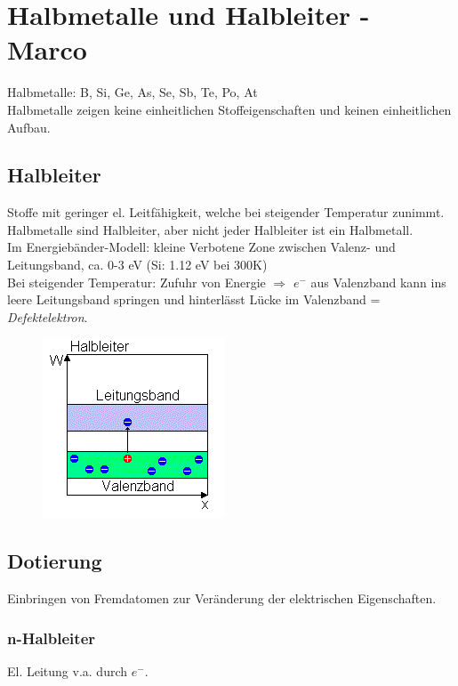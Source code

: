 \section{Halbmetalle und Halbleiter - Marco}
Halbmetalle: B, Si, Ge, As, Se, Sb, Te, Po, At \\

Halbmetalle zeigen keine einheitlichen Stoffeigenschaften und keinen einheitlichen Aufbau. \\

\subsection{Halbleiter}
Stoffe mit geringer el. Leitfähigkeit, welche bei steigender Temperatur zunimmt. Halbmetalle sind Halbleiter, aber nicht jeder Halbleiter ist ein Halbmetall. \\

Im Energiebänder-Modell: kleine Verbotene Zone zwischen Valenz- und Leitungsband, ca. 0-3 eV (Si: 1.12 eV bei 300K) \\

Bei steigender Temperatur: Zufuhr von Energie $\Rightarrow$ $e^-$ aus Valenzband kann ins leere Leitungsband springen und hinterlässt Lücke im Valenzband = \emph{Defektelektron}.

\begin{figure}[htbp]
	\centering
	\includegraphics[width=0.4\linewidth]{images/4_Halbleiter_Energiebaender.png}
\end{figure}

\subsection{Dotierung}
Einbringen von Fremdatomen zur Veränderung der elektrischen Eigenschaften.

\subsubsection{n-Halbleiter}
El. Leitung v.a. durch $e^-$. \\

